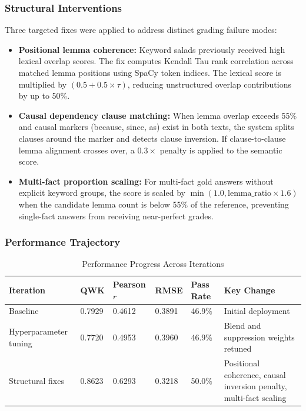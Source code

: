 \subsubsection{Structural Interventions}
Three targeted fixes were applied to address distinct grading failure modes:
\begin{itemize}
    \item \textbf{Positional lemma coherence:} Keyword salads previously received high lexical overlap scores. The fix computes Kendall Tau rank correlation across matched lemma positions using SpaCy token indices. The lexical score is multiplied by $(0.5 + 0.5 \times \tau)$, reducing unstructured overlap contributions by up to 50\%.
    \item \textbf{Causal dependency clause matching:} When lemma overlap exceeds 55\% and causal markers (because, since, as) exist in both texts, the system splits clauses around the marker and detects clause inversion. If clause-to-clause lemma alignment crosses over, a $0.3\times$ penalty is applied to the semantic score.
    \item \textbf{Multi-fact proportion scaling:} For multi-fact gold answers without explicit keyword groups, the score is scaled by $\min(1.0, \text{lemma\_ratio} \times 1.6)$ when the candidate lemma count is below 55\% of the reference, preventing single-fact answers from receiving near-perfect grades.
\end{itemize}

\subsubsection{Performance Trajectory}
\renewcommand{\arraystretch}{1.15}
\setlength{\tabcolsep}{4pt}
\begin{table}[H]
\centering
\caption{Performance Progress Across Iterations}
\label{tab:grading-performance-trajectory}
\begin{tabular}{|p{3.3cm}|p{1.8cm}|p{2.2cm}|p{1.8cm}|p{2.2cm}|p{4.0cm}|}
\hline
\textbf{Iteration} & \textbf{QWK} & \textbf{Pearson $r$} & \textbf{RMSE} & \textbf{Pass Rate} & \textbf{Key Change} \\ \hline
Baseline & 0.7929 & 0.4612 & 0.3891 & 46.9\% & Initial deployment \\ \hline
Hyperparameter tuning & 0.7720 & 0.4953 & 0.3960 & 46.9\% & Blend and suppression weights retuned \\ \hline
Structural fixes & 0.8623 & 0.6293 & 0.3218 & 50.0\% & Positional coherence, causal inversion penalty, multi-fact scaling \\ \hline
\end{tabular}
\end{table}

